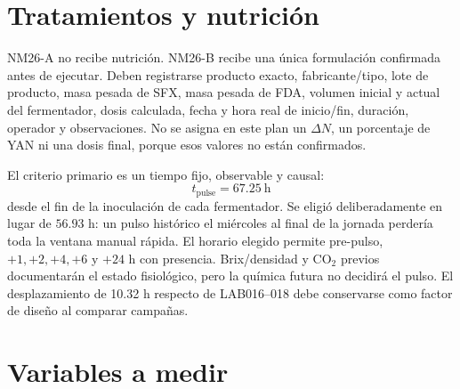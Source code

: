 \documentclass[11pt,a4paper]{article}
\begin{document}
\section{Tratamientos y nutrición}

NM26-A no recibe nutrición. NM26-B recibe una única formulación confirmada antes
de ejecutar. Deben registrarse producto exacto, fabricante/tipo, lote de producto,
masa pesada de SFX, masa pesada de FDA, volumen inicial y actual del fermentador,
dosis calculada, fecha y hora real de inicio/fin, duración, operador y
observaciones. No se asigna en este plan un \(\Delta N\), un porcentaje de YAN ni
una dosis final, porque esos valores no están confirmados.

El criterio primario es un tiempo fijo, observable y causal:
\[
t_{\mathrm{pulse}}=67.25\ \mathrm{h}
\]
desde el fin de la inoculación de cada fermentador. Se eligió deliberadamente en
lugar de \(56.93\) h: un pulso histórico el miércoles al final de la jornada
perdería toda la ventana manual rápida. El horario elegido permite pre-pulso,
\(+1,+2,+4,+6\) y \(+24\) h con presencia. Brix/densidad y CO$_2$ previos
documentarán el estado fisiológico, pero la química futura no decidirá el pulso.
El desplazamiento de 10.32 h respecto de LAB016--018 debe conservarse como factor
de diseño al comparar campañas.

\section{Variables a medir}
\end{document}
